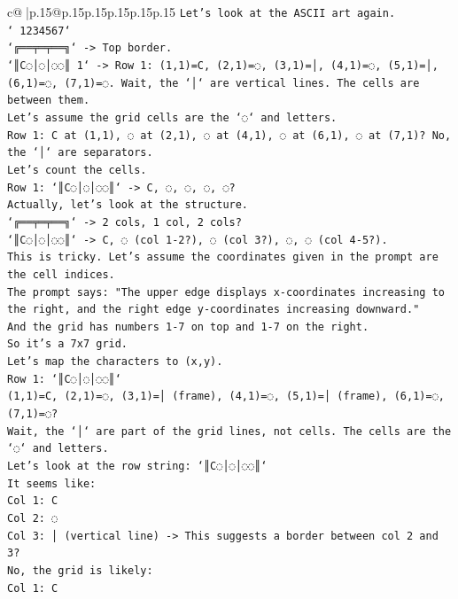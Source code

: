 \documentclass{article}
\begin{document}
{\begin{supertabular}{c@{$\;$}|p{.15\linewidth}@{}p{.15\linewidth}p{.15\linewidth}p{.15\linewidth}p{.15\linewidth}p{.15\linewidth}}
{{{\texttt{Let's look at the ASCII art again.} \\
\texttt{` 1234567`} \\
\texttt{`╔══╤═╤══╗` {-}> Top border.} \\
\texttt{`║C◌│◌│◌◌║ 1` {-}> Row 1: (1,1)=C, (2,1)=◌, (3,1)=│, (4,1)=◌, (5,1)=│, (6,1)=◌, (7,1)=◌. Wait, the `│` are vertical lines. The cells are between them.} \\
\texttt{Let's assume the grid cells are the `◌` and letters.} \\
\texttt{Row 1: C at (1,1), ◌ at (2,1), ◌ at (4,1), ◌ at (6,1), ◌ at (7,1)? No, the `│` are separators.} \\
\texttt{Let's count the cells.} \\
\texttt{Row 1: `║C◌│◌│◌◌║` {-}> C, ◌, ◌, ◌, ◌?} \\
\texttt{Actually, let's look at the structure.} \\
\texttt{`╔══╤═╤══╗` {-}> 2 cols, 1 col, 2 cols?} \\
\texttt{`║C◌│◌│◌◌║` {-}> C, ◌ (col 1{-}2?), ◌ (col 3?), ◌, ◌ (col 4{-}5?).} \\
\texttt{This is tricky. Let's assume the coordinates given in the prompt are the cell indices.} \\
\texttt{The prompt says: "The upper edge displays x{-}coordinates increasing to the right, and the right edge y{-}coordinates increasing downward."} \\
\texttt{And the grid has numbers 1{-}7 on top and 1{-}7 on the right.} \\
\texttt{So it's a 7x7 grid.} \\
\texttt{Let's map the characters to (x,y).} \\
\texttt{Row 1: `║C◌│◌│◌◌║`} \\
\texttt{(1,1)=C, (2,1)=◌, (3,1)=│ (frame), (4,1)=◌, (5,1)=│ (frame), (6,1)=◌, (7,1)=◌?} \\
\texttt{Wait, the `│` are part of the grid lines, not cells. The cells are the `◌` and letters.} \\
\texttt{Let's look at the row string: `║C◌│◌│◌◌║`} \\
\texttt{It seems like:} \\
\texttt{Col 1: C} \\
\texttt{Col 2: ◌} \\
\texttt{Col 3: │ (vertical line) {-}> This suggests a border between col 2 and 3?} \\
\texttt{No, the grid is likely:} \\
\texttt{Col 1: C} \\
}}}
\end{supertabular}}
\end{document}

